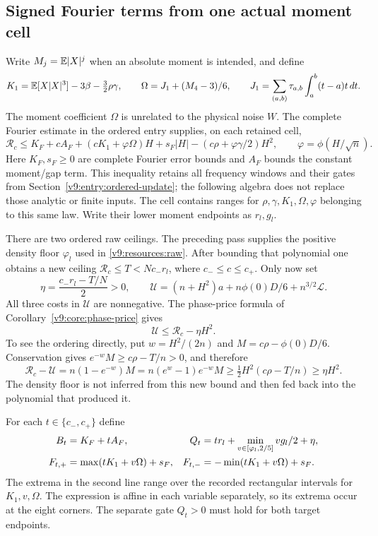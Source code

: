 \subsection{Signed Fourier terms from one actual moment cell}
\label{v9:resources:signed}
Write $M_j=\mathbb E|X|^j$ when an absolute moment is intended, and define
\[
 K_1=\mathbb E[X|X|^3]-3\beta-\tfrac32\rho\gamma,
 \qquad \Omega=J_1+(M_4-3)/6,
 \qquad J_1=\sum_{(a,b)}\tau_{a,b}\int_a^b(t-a)t\,dt.
\]
The moment coefficient $\Omega$ is unrelated to the physical noise $W$.
The complete Fourier estimate in the ordered entry supplies, on each
retained cell,
\begin{equation}\label{v9:resources:raw}
 \mathcal R_c\le K_F+cA_F+(cK_1+\varphi\Omega)H+s_F|H|
             -(c\rho+\varphi\gamma/2)H^2,
 \qquad\varphi=\phi(H/\sqrt n).
\end{equation}
Here $K_F,s_F\ge0$ are complete Fourier error bounds and $A_F$ bounds
the constant moment/gap term. This inequality retains all frequency
windows and their gates from Section~\ref{v9:entry:ordered-update};
the following algebra does not replace those analytic or finite inputs.
The cell contains ranges for $\rho,\gamma,K_1,\Omega,\varphi$ belonging
to this same law. Write their lower moment endpoints as $r_l,g_l$.

There are two ordered raw ceilings. The preceding pass supplies the
positive density floor $\varphi_l$ used in \eqref{v9:resources:raw}.
After bounding that polynomial one obtains a new ceiling
$\mathcal R_c\le T<Nc_-r_l$, where $c_-\le c\le c_+$.
Only now set
\[
 \eta=\frac{c_-r_l-T/N}{2}>0,\qquad
 \mathcal U=(n+H^2)a+n\phi(0)D/6+n^{3/2}\mathcal L.
\]
All three costs in $\mathcal U$ are nonnegative. The phase-price formula
of Corollary~\ref{v9:core:phase-price} gives
\begin{equation}\label{v9:resources:price}
 \mathcal U\le\mathcal R_c-\eta H^2.
\end{equation}
To see the ordering directly, put $w=H^2/(2n)$ and
$M=c\rho-\phi(0)D/6$. Conservation gives
$e^{-w}M\ge c\rho-T/n>0$, and therefore
\[
 \mathcal R_c-\mathcal U=n(1-e^{-w})M
 =n(e^w-1)e^{-w}M
 \ge\tfrac12H^2(c\rho-T/n)\ge\eta H^2.
\]
The density floor is not inferred from this new bound and then fed back
into the polynomial that produced it.

For each $t\in\{c_-,c_+\}$ define
\begin{align}
 B_t&=K_F+tA_F,&
 Q_t&=tr_l+\min_{v\in[\varphi_l,2/5]}vg_l/2+\eta,
       \label{v9:resources:quadratics}\\
 F_{t,+}&=\max(tK_1+v\Omega)+s_F,&
 F_{t,-}&=-\min(tK_1+v\Omega)+s_F.\notag
\end{align}
The extrema in the second line range over the recorded rectangular
intervals for $K_1,v,\Omega$. The expression is affine in each variable
separately, so its extrema occur at the eight corners. The separate
gate $Q_t>0$ must hold for both target endpoints.

